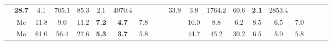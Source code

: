 \documentclass[french,10pt]{article}
\begin{document}
\begin{landscape}
\begin{longtable}{ l  c | c c c | c c c | c c c | c c c | c c c | c c c | }
                    &                     \textbf{ 28.7}
     & {\footnotesize     4.1
    } & {\footnotesize     705.1
     }
    
    
                    &                     85.3
     & {\footnotesize     2.1
    } & {\footnotesize     4970.4
     }
    
    
                    & & &

                    &                     33.9
     & {\footnotesize     3.8
    } & {\footnotesize     1764.2
     }
    
    
                    &                     60.6
     & {\footnotesize     \textbf{ 2.1}
    } & {\footnotesize     2853.4
     }
    
    
                    & & &

                    \\*
                        & {\small Me  }

                    &                     11.8
     & {\footnotesize     9.0
    } & {\footnotesize     11.2
     }
    
    
                    &                     \textbf{ 7.2}
     & {\footnotesize     \textbf{ 4.7}
    } & {\footnotesize     7.8
     }
    
    
                    & & &

                    &                     10.0
     & {\footnotesize     8.8
    } & {\footnotesize     6.2
     }
    
    
                    &                     8.5
     & {\footnotesize     6.5
    } & {\footnotesize     7.0
     }
    
    
                    & & &

                    \\*
                        & {\small Mo  }

                    &                     61.0
     & {\footnotesize     56.4
    } & {\footnotesize     27.6
     }
    
    
                    &                     \textbf{ 5.3}
     & {\footnotesize     \textbf{ 3.7}
    } & {\footnotesize     5.8
     }
    
    
                    & & &

                    &                     44.7
     & {\footnotesize     45.2
    } & {\footnotesize     30.2
     }
    
    
                    &                     6.5
     & {\footnotesize     5.0
    } & {\footnotesize     5.8
     }
    

\end{longtable}
\end{landscape}
\end{document}
